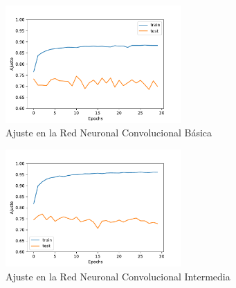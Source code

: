 \newpage
\appendix 
{}
\begin{figure}[h!]
	\centering
	\includegraphics[width=0.6\textwidth]{../Figuras/accuracy_cnn_1.pdf}
	\caption{Ajuste en la Red Neuronal Convolucional Básica}
\end{figure}
\begin{figure}[h!]
	\centering
	\includegraphics[width=0.6\textwidth]{../Figuras/accuracy_cnn_2.pdf}
	\caption{Ajuste en la Red Neuronal Convolucional Intermedia}
\end{figure}

